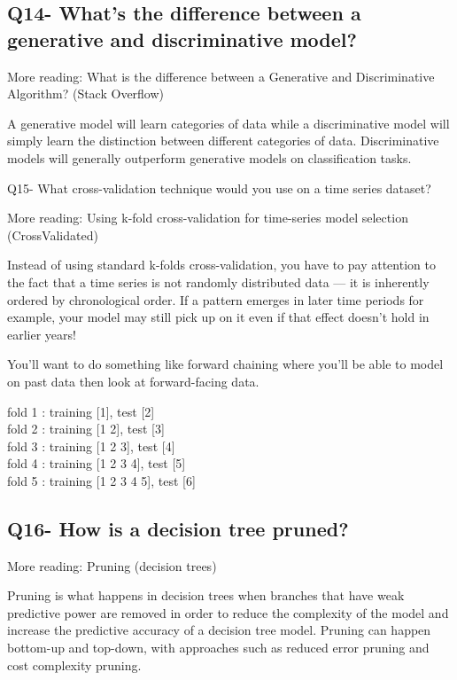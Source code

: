 \documentclass[11pt,a4paper]{article}
\begin{document}
\subsection{Q14- What’s the difference between a generative and discriminative model?}

More reading: What is the difference between a Generative and Discriminative Algorithm? (Stack Overflow)

A generative model will learn categories of data while a discriminative model will simply learn the distinction between different categories of data. Discriminative models will generally outperform generative models on classification tasks.

Q15- What cross-validation technique would you use on a time series dataset?

More reading: Using k-fold cross-validation for time-series model selection (CrossValidated)

Instead of using standard k-folds cross-validation, you have to pay attention to the fact that a time series is not randomly distributed data — it is inherently ordered by chronological order. If a pattern emerges in later time periods for example, your model may still pick up on it even if that effect doesn’t hold in earlier years!

You’ll want to do something like forward chaining where you’ll be able to model on past data then look at forward-facing data.

fold 1 : training [1], test [2] \\
fold 2 : training [1 2], test [3] \\
fold 3 : training [1 2 3], test [4] \\
fold 4 : training [1 2 3 4], test [5] \\
fold 5 : training [1 2 3 4 5], test [6] \\

\subsection{Q16- How is a decision tree pruned?}

More reading: Pruning (decision trees)

Pruning is what happens in decision trees when branches that have weak predictive power are removed in order to reduce the complexity of the model and increase the predictive accuracy of a decision tree model. Pruning can happen bottom-up and top-down, with approaches such as reduced error pruning and cost complexity pruning.
\end{document}
